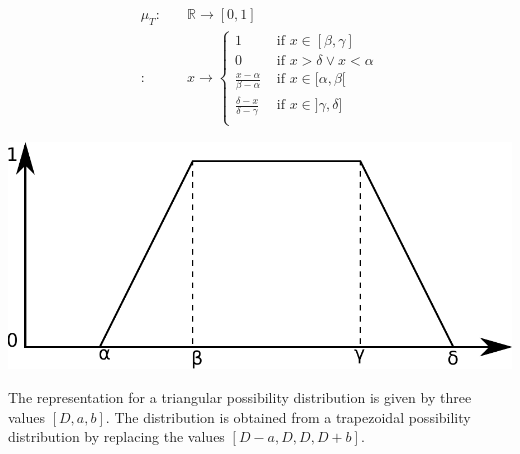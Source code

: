 
\begin{align}
\mu_T : & \quad \mathbb{R} \rightarrow \left[0,1\right] \\
\nonumber
 : & \quad x \rightarrow
\begin{cases}
1 & \mbox{ if } x \in [\beta,\gamma] \\
0 & \mbox{ if } x > \delta \vee x < \alpha \\
\frac{x-\alpha}{\beta - \alpha} & \mbox{ if } x \in [\alpha,\beta[ \\
\frac{\delta -x}{\delta - \gamma} & \mbox{ if } x \in ]\gamma,\delta] \\
\end{cases}
\end{align}


\vspace*{13pt}
\begin{center}
{
\includegraphics[scale=0.25]{./graphs/trapezoidalDistribution.pdf}

}
\end{center}
\vspace*{10pt}
\vspace*{13pt}
%  


The representation for a triangular possibility distribution is given by three values $\left[D,a,b \right]$. The distribution is obtained from a trapezoidal possibility distribution by replacing the values $\left[D-a, D, D, D+b \right]$.


